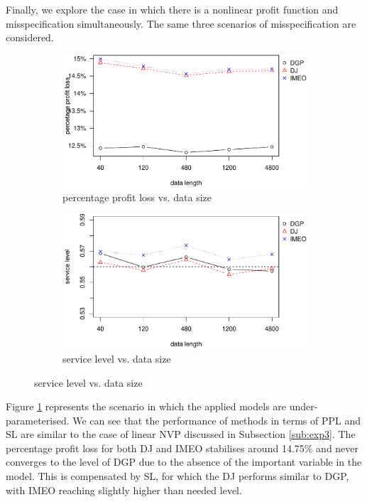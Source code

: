 \documentclass{article}
\begin{document}
Finally, we explore the case in which there is a nonlinear profit function and misspecification simultaneously. The same three scenarios of misspecification are considered.

\begin{figure}[ht]
\centering
\caption{Performance vs. sample size with under-parameterised nonlinear model}
\begin{subfigure}[b]{0.48\textwidth}
\centering
\includegraphics[width=\textwidth]{nonAR(1)ppl.pdf}
\caption{percentage profit loss vs. data size}
\end{subfigure}
\hfill
\begin{subfigure}[b]{0.48\textwidth}
\centering
\includegraphics[width=\textwidth]{nonAR(1)sl.pdf}
\caption{service level vs. data size}
\end{subfigure}
\label{fig:misnon_under}
\end{figure}

Figure \ref{fig:misnon_under} represents the scenario in which the applied models are under-parameterised. We can see that the performance of methods in terms of PPL and SL are similar to the case of linear NVP discussed in Subsection \ref{sub:exp3}. The percentage profit loss for both DJ and IMEO stabilises around 14.75\% and never converges to the level of DGP due to the absence of the important variable in the model. This is compensated by SL, for which the DJ performs similar to DGP, with IMEO reaching slightly higher than needed level.
\end{document}
